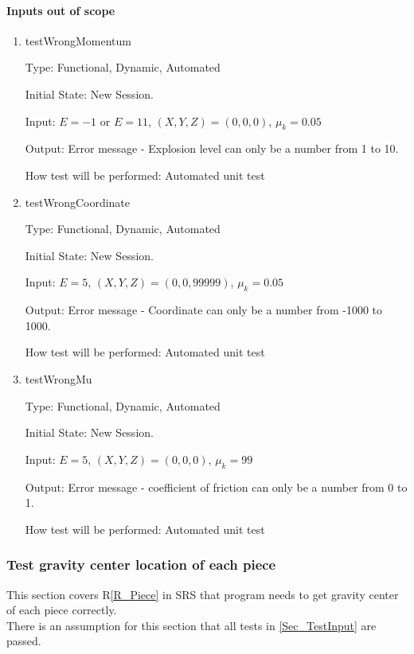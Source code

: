 \documentclass[12pt, titlepage]{article}
\newcommand{\rref}[1]{R\ref{#1}}
\begin{document}
\paragraph{Inputs out of scope}

\begin{enumerate}

\item{testWrongMomentum\\}

Type: Functional, Dynamic, Automated

Initial State: New Session.

Input: $E = -1$ or $E = 11$, $(X,Y,Z) = (0,0,0)$, $\mu_{k} = 0.05$  

Output: Error message - Explosion level can only be a number from 1 to 10.

How test will be performed: Automated unit test

\item{testWrongCoordinate\\}

Type: Functional, Dynamic, Automated

Initial State: New Session.

Input: $E = 5$, $(X,Y,Z) = (0,0,99999)$, $\mu_{k} = 0.05$  

Output: Error message - Coordinate can only be a number from -1000 to 1000.

How test will be performed: Automated unit test

\item{testWrongMu\\}

Type: Functional, Dynamic, Automated

Initial State: New Session.

Input: $E = 5$, $(X,Y,Z) = (0,0,0)$, $\mu_{k} = 99$  

Output: Error message - coefficient of friction can only be a number from 0 to 1.

How test will be performed: Automated unit test 

\end{enumerate}

\subsubsection{Test gravity center location of each piece}
\label{Sec_testGravityCenter}

This section covers \rref{R_Piece} in SRS that program needs to get gravity center of each piece correctly. \\
There is an assumption for this section that all tests in \ref{Sec_TestInput} are passed.
\end{document}

